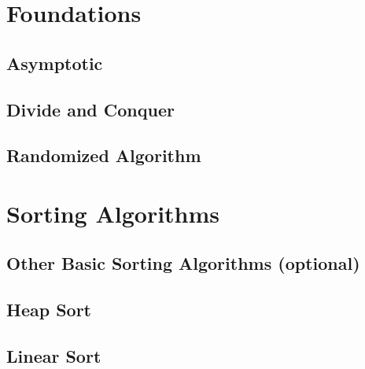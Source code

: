 \documentclass[11pt,fleqn]{book} %
\begin{document}
\part{Foundations}



\chapter{Asymptotic}



\chapter{Divide and Conquer}



\chapter{Randomized Algorithm}








\part{Sorting Algorithms}

\chapter{Other Basic Sorting Algorithms (optional)}



\chapter{Heap Sort}



\chapter{Linear Sort}
\end{document}
